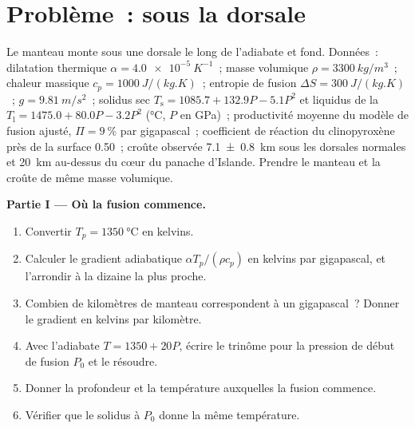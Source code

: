 \section{Problème~: sous la dorsale}

\begin{problem}
\label{pb:b2:mantle-melting:1}
Le manteau monte sous une dorsale le long de l'adiabate et fond. Données~: dilatation
thermique $\alpha = \qty{4.0e-5}{K^{-1}}$~; masse volumique $\rho = \qty{3300}{kg/m^3}$~;
chaleur massique $c_p = \qty{1000}{J/(kg.K)}$~; entropie de fusion $\Delta S =
\qty{300}{J/(kg.K)}$~; $g = \qty{9.81}{m/s^2}$~; solidus sec $T_{\mathrm s} =
1085.7 + 132.9P - 5.1P^2$ et liquidus de la  $T_{\mathrm l} = 1475.0 +
80.0P - 3.2P^2$ (\unit{\celsius}, $P$ en \unit{GPa})~; productivité moyenne du
modèle de fusion ajusté, $\Pi = \qty{9}{\percent}$ par gigapascal~; coefficient de réaction du
clinopyroxène près de la surface 0.50~; croûte observée \qty[uncertainty-mode=separate]{7.1 \pm 0.8}{km}
sous les dorsales normales et \qty{20}{km} au-dessus du cœur du panache d'Islande. Prendre le manteau
et la croûte de même masse volumique.

\noindent\textbf{Partie I --- Où la fusion commence.}
\begin{enumerate}
\item Convertir $T_p = \qty{1350}{\celsius}$ en kelvins.
\item Calculer le gradient adiabatique $\alpha T_p/(\rho c_p)$ en kelvins par
gigapascal, et l'arrondir à la dizaine la plus proche.
\item Combien de kilomètres de manteau correspondent à un gigapascal~? Donner le gradient en
kelvins par kilomètre.
\item Avec l'adiabate $T = 1350 + 20P$, écrire le trinôme pour la pression de début de fusion
$P_0$ et le résoudre.
\item Donner la profondeur et la température auxquelles la fusion commence.
\item Vérifier que le solidus à $P_0$ donne la même température.
\end{enumerate}


\end{problem}
